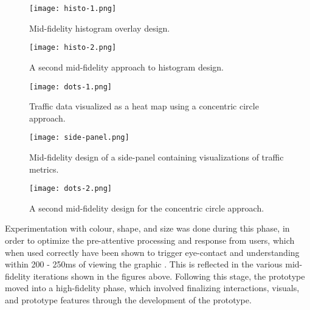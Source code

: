 \documentclass{article}
\begin{document}
\begin{figure}[htbp!]
  \begin{centering}
    \texttt{[image: histo-1.png]}
    \caption{Mid-fidelity histogram overlay design.}
    \label{fig:histo-1}
  \end{centering}
\end{figure}

\begin{figure}[htbp!]
  \begin{centering}
    \texttt{[image: histo-2.png]}
    \caption{A second mid-fidelity approach to histogram design.}
    \label{fig:histo-2}
  \end{centering}
\end{figure}

\begin{figure}[htbp!]
  \begin{centering}
    \texttt{[image: dots-1.png]}
    \caption{Traffic data visualized as a heat map using a concentric circle approach.}
    \label{fig:dots-1}
  \end{centering}
\end{figure}

\begin{figure}[htbp!]
  \begin{centering}
    \texttt{[image: side-panel.png]}
    \caption{Mid-fidelity design of a side-panel containing visualizations of traffic metrics.}
    \label{fig:side-panel}
  \end{centering}
\end{figure}

\begin{figure}[htbp!]
  \begin{centering}
    \texttt{[image: dots-2.png]}
    \caption{A second mid-fidelity design for the concentric circle approach.}
    \label{fig:dots-2}
  \end{centering}
\end{figure}

Experimentation with colour, shape, and size was done during this phase, in order to optimize the pre-attentive processing and response from users, which when used correctly have been shown to trigger eye-contact and understanding within 200 - 250ms of viewing the graphic \cite{Healey93} \cite{Healey96}.
This is reflected in the various mid-fidelity iterations shown in the figures above.
Following this stage, the prototype moved into a high-fidelity phase, which involved finalizing interactions, visuals, and prototype features through the development of the prototype.\\
\end{document}
